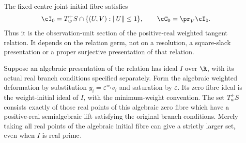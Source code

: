 \begin{theorem}\label{thm:canonical}
The fixed-centre joint initial fibre satisfies
\begin{equation}\label{eq:canonical-identification}
 \cI_0=T_w^+S\cap\{(U,V):\|U\|\le1\},\qquad
 \cC_0=\pr_V\cI_0.
\end{equation}
Thus it is the observation-unit section of the positive-real weighted
tangent relation. It depends on the relation germ, not on a resolution,
a square-slack presentation or a proper surjective presentation of that
relation.

Suppose an algebraic presentation of the relation has ideal $I$ over
$\R$, with its actual real branch conditions specified separately.
Form the algebraic weighted deformation by substitution
$y_i=\varepsilon^{w_i}v_i$ and saturation by $\varepsilon$.
Its zero-fibre ideal is the weight-initial ideal of $I$, with the
minimum-weight convention. The set $T_w^+S$ consists exactly of those
real points of this algebraic zero fibre which have a positive-real
semialgebraic lift satisfying the original branch conditions. Merely
taking all real points of the algebraic initial fibre can give a strictly
larger set, even when $I$ is real prime.
\end{theorem}
